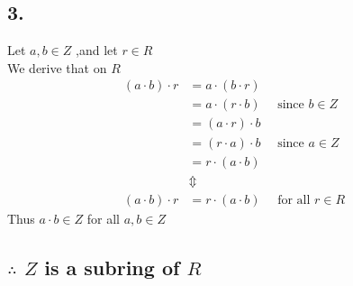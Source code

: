\documentclass[11pt, a4paper]{article}
\begin{document}
\subsection*{3.}
Let $a,b\in Z$ ,and let $r\in R$\\
We derive that on $R$
\begin{align*}
    (a\cdot b)\cdot r
    &= a\cdot (b\cdot r)\\
    &= a\cdot (r\cdot b) \quad \text{ since } b\in Z\\
    &= (a\cdot r)\cdot b\\
    &= (r\cdot a)\cdot b \quad \text{ since } a\in Z\\
    &= r\cdot (a\cdot b)\\[10pt]
    &\Updownarrow\\[10pt]
    (a\cdot b)\cdot r &= r\cdot (a\cdot b) \quad \text{ for all } r\in R
\end{align*}
Thus $a\cdot b\in Z$ for all $a,b\in Z$

\subsection*{$\therefore$ $Z$ is a subring of $R$}
\end{document}

